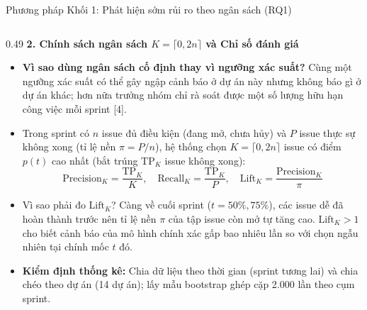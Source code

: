 \begin{frame}{Phương pháp Khối 1: Phát hiện sớm rủi ro theo ngân sách (RQ1)}
\begin{columns}[T,onlytextwidth]
\begin{column}{0.49\textwidth}
      \textbf{2. Chính sách ngân sách $K = \lceil 0{,}2n \rceil$ và Chỉ số đánh giá}
      \begin{itemize}
        \setlength{\itemsep}{1.5pt}
        \item \textbf{Vì sao dùng ngân sách cố định thay vì ngưỡng xác suất?} Cùng một ngưỡng xác suất có thể gây ngập cảnh báo ở dự án này nhưng không báo gì ở dự án khác; hơn nữa trưởng nhóm chỉ rà soát được một số lượng hữu hạn công việc mỗi sprint [4].
        \item Trong sprint có $n$ issue đủ điều kiện (đang mở, chưa hủy) và $P$ issue thực sự không xong (tỉ lệ nền $\pi = P/n$), hệ thống chọn $K = \lceil 0{,}2n \rceil$ issue có điểm $p(t)$ cao nhất (bắt trúng $\text{TP}_K$ issue không xong):
        $$\text{Precision}_K = \frac{\text{TP}_K}{K}, \quad \text{Recall}_K = \frac{\text{TP}_K}{P}, \quad \text{Lift}_K = \frac{\text{Precision}_K}{\pi}$$
        \item \alert{Vì sao phải đo $\text{Lift}_K$?} Càng về cuối sprint ($t = 50\%, 75\%$), các issue dễ đã hoàn thành trước nên tỉ lệ nền $\pi$ của tập issue còn mở tự tăng cao. $\text{Lift}_K > 1$ cho biết cảnh báo của mô hình chính xác gấp bao nhiêu lần so với chọn ngẫu nhiên tại chính mốc $t$ đó.
        \item \textbf{Kiểm định thống kê:} Chia dữ liệu theo thời gian (sprint tương lai) và chia chéo theo dự án (14 dự án); lấy mẫu bootstrap ghép cặp 2.000 lần theo cụm sprint.
      \end{itemize}
    \end{column}
  \end{columns}
\end{frame}

